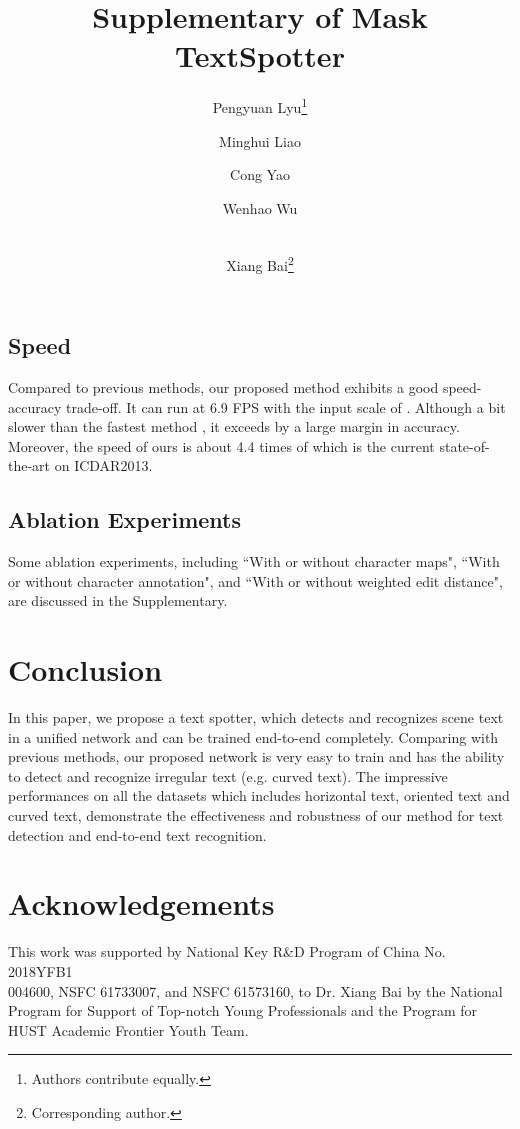 \documentclass[runningheads]{llncs}
\makeatletter
\newcommand{\printfnsymbol}[1]{\textsuperscript{\@fnsymbol{#1}}}
\makeatother
\begin{document}
\subsection{Speed}

Compared to previous methods,  our proposed method exhibits a good speed-accuracy trade-off. It can run at 6.9 FPS with the input scale of . Although a bit slower than the fastest method \cite{Busta_2017_ICCV},  it exceeds \cite{Busta_2017_ICCV} by a large margin in accuracy. Moreover, the speed of ours is about 4.4 times of \cite{Li_2017_ICCV} which is the current state-of-the-art on ICDAR2013.

\subsection{Ablation Experiments}
Some ablation experiments, including ``With or without character maps", ``With or without character annotation", and ``With or without weighted edit distance", are discussed in the Supplementary.

\section{Conclusion}
In this paper, we propose a text spotter, which detects and recognizes scene text in a unified network and can be trained end-to-end completely. Comparing with previous methods, our proposed network is very easy to train and has the ability to detect and recognize irregular text (e.g. curved text). The impressive  performances on all the datasets which  includes  horizontal text,  oriented text and curved text,  demonstrate the effectiveness and robustness of our method for text detection and end-to-end text recognition.

\section*{Acknowledgements}
This work was supported by National Key R\&D Program of China No. 2018YFB1\\004600, NSFC 61733007, and NSFC 61573160, to Dr. Xiang Bai by the National Program for Support of Top-notch Young Professionals and the Program for HUST Academic Frontier Youth Team.












\title{Supplementary of Mask TextSpotter}
\author{Pengyuan Lyu\thanks{Authors contribute equally.} \and
Minghui Liao\printfnsymbol{1} \and
Cong Yao \and
Wenhao Wu \and \\
Xiang Bai\thanks{Corresponding author.}}
\end{document}
